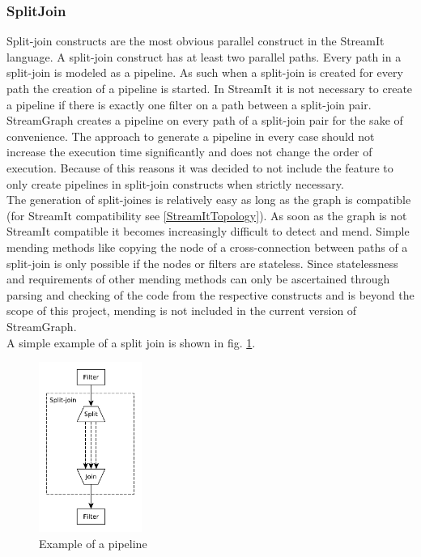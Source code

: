 \documentclass[journal]{IEEEtran}
\begin{document}
\subsubsection{SplitJoin}
\noindent Split-join constructs are the most obvious parallel construct in the
StreamIt language. A split-join construct has at least two parallel paths. Every
path in a split-join is modeled as a pipeline. As such when a split-join is
created for every path the creation of a pipeline is started. In StreamIt it is
not necessary to create a pipeline if there is exactly one filter on a path
between a split-join pair. StreamGraph creates a pipeline on every path of a
split-join pair for the sake of convenience. The approach to generate a
pipeline in every case should not increase the execution time significantly and
does not change the order of execution. Because of this reasons it was decided
to not include the feature to only create pipelines in split-join constructs 
when strictly necessary.\\
The generation of split-joines is relatively easy as long as the graph is compatible
(for StreamIt compatibility see \ref{StreamItTopology}). As soon as the graph is not 
StreamIt compatible it becomes increasingly difficult to detect and mend. Simple 
mending methods like copying the node of a cross-connection between paths of a 
split-join is only possible if the nodes or filters are stateless. Since 
statelessness and requirements of other mending methods can only be ascertained 
through parsing and checking of the code from the respective constructs and is beyond 
the scope of this project, mending is not included in the current version of StreamGraph.\\
A simple example of a split join is shown in fig. \ref{fig_Split_Join}.\\

\begin{figure}[h]
	\centering
	\includegraphics[width=0.3\textwidth]{SplitJoinGraphic}
	\caption{Example of a pipeline}
	\label{fig_Split_Join}
\end{figure}
\end{document}
